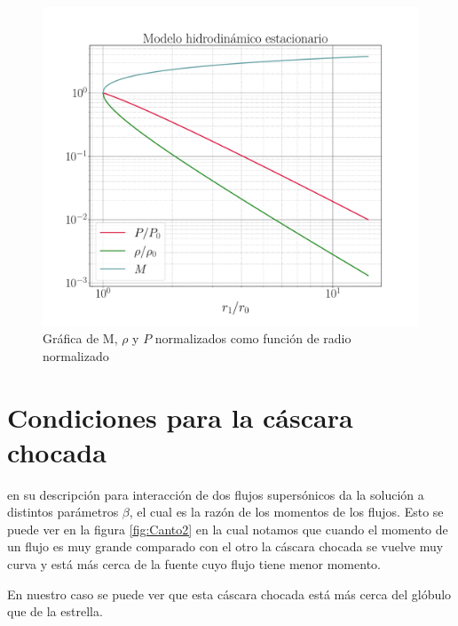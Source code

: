 \documentclass{book}
\begin{document}
\begin{figure}[htb]
    \centering    \includegraphics[width=\textwidth]{Nuevas imagenes finales/C2_estructura.pdf}
    \caption{Gráfica de M, $\rho$ y $P$ normalizados como función de radio normalizado}
    \label{fig:grafica_C2}
\end{figure}

\section{Condiciones para la cáscara chocada}

\cite{Canto:1996} en su descripción para interacción de dos flujos supersónicos da la solución a distintos parámetros $\beta$, el cual es la razón de los momentos de los flujos. Esto se puede ver en la figura \ref{fig:Canto2} en la cual notamos que cuando el momento de un flujo es muy  grande comparado con el otro la cáscara chocada se vuelve muy curva y está más cerca de la fuente cuyo flujo tiene menor momento.

En nuestro caso se puede ver que esta cáscara chocada está más cerca del glóbulo que de la estrella.
\end{document}
